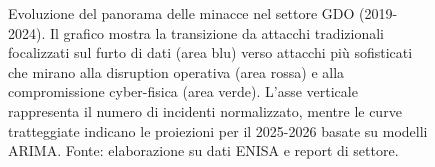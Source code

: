 \begin{figure}[htbp]
\centering
%
%
\caption{Evoluzione del panorama delle minacce nel settore GDO (2019-2024). Il grafico mostra la transizione da attacchi tradizionali focalizzati sul furto di dati (area blu) verso attacchi più sofisticati che mirano alla disruption operativa (area rossa) e alla compromissione cyber-fisica (area verde). L'asse verticale rappresenta il numero di incidenti normalizzato, mentre le curve tratteggiate indicano le proiezioni per il 2025-2026 basate su modelli ARIMA. Fonte: elaborazione su dati ENISA e report di settore.}
\label{fig:threat_evolution}
\end{figure}

